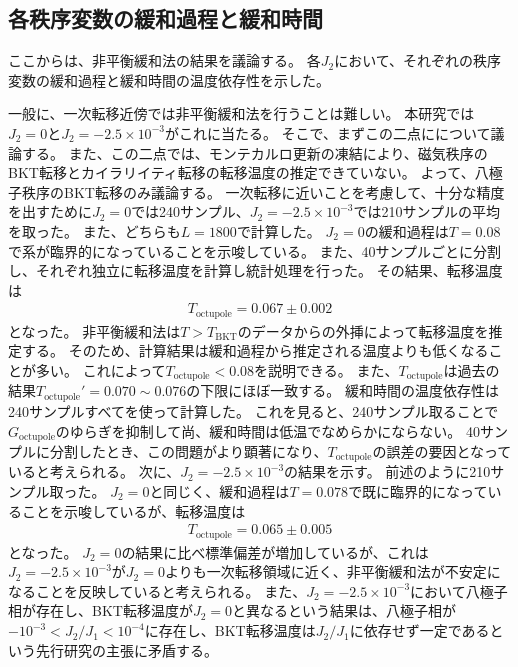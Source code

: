 \documentclass[12pt,titlepage,dvipdfmx]{jarticle}
\begin{document}
\newpage

\subsection{各秩序変数の緩和過程と緩和時間}
ここからは、非平衡緩和法の結果を議論する。
各$J_2$において、それぞれの秩序変数の緩和過程と緩和時間の温度依存性を示した。

一般に、一次転移近傍では非平衡緩和法を行うことは難しい。
本研究では$J_2=0$と$J_2=-2.5\times10^{-3}$がこれに当たる。
そこで、まずこの二点にについて議論する。
また、この二点では、モンテカルロ更新の凍結により、磁気秩序のBKT転移とカイラリイティ転移の転移温度の推定できていない。
よって、八極子秩序のBKT転移のみ議論する。
一次転移に近いことを考慮して、十分な精度を出すために$J_2=0$では240サンプル、$J_2=-2.5\times10^{-3}$では210サンプルの平均を取った。
また、どちらも$L=1800$で計算した。
$J_2=0$の緩和過程は$T=0.08$で系が臨界的になっていることを示唆している。
また、40サンプルごとに分割し、それぞれ独立に転移温度を計算し統計処理を行った。
その結果、転移温度は
\begin{align}
   T_{\mathrm{octupole}}= 0.067 \pm 0.002
\end{align}
となった。
非平衡緩和法は$T>T_{\mathrm{BKT}}$のデータからの外挿によって転移温度を推定する。
そのため、計算結果は緩和過程から推定される温度よりも低くなることが多い。
これによって$T_{\mathrm{octupole}}<0.08$を説明できる。
また、$T_{\mathrm{octupole}}$は過去の結果$T_{\mathrm{octupole}}'=0.070\sim0.076$\cite{Rzchowski1997}の下限にほぼ一致する。
緩和時間の温度依存性は240サンプルすべてを使って計算した。
これを見ると、240サンプル取ることで$G_{\mathrm{octupole}}$のゆらぎを抑制して尚、緩和時間は低温でなめらかにならない。
40サンプルに分割したとき、この問題がより顕著になり、$T_{\mathrm{octupole}}$の誤差の要因となっていると考えられる。
次に、$J_2=-2.5\times10^{-3}$の結果を示す。
前述のように210サンプル取った。
$J_2=0$と同じく、緩和過程は$T=0.078$で既に臨界的になっていることを示唆しているが、転移温度は
\begin{align}
   T_{\mathrm{octupole}} = 0.065 \pm 0.005
\end{align}
となった。
$J_2=0$の結果に比べ標準偏差が増加しているが、これは$J_2=-2.5\times10^{-3}$が$J_2=0$よりも一次転移領域に近く、非平衡緩和法が不安定になることを反映していると考えられる。
また、$J_2=-2.5\times10^{-3}$において八極子相が存在し、BKT転移温度が$J_2=0$と異なるという結果は、八極子相が$-10^{-3}<J_2/J_1<10^{-4}$に存在し、BKT転移温度は$J_2/J_1$に依存せず一定であるという先行研究の主張に矛盾する。
\end{document}
